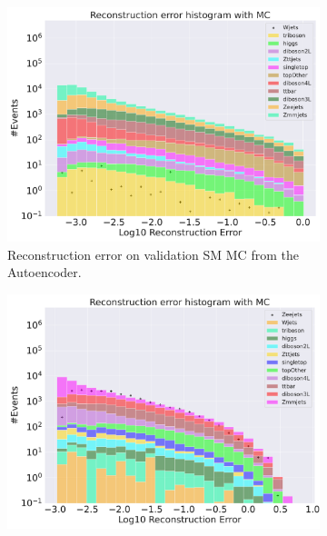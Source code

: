 \begin{figure}[h!]
    \centering
    \begin{subfigure}{.8\textwidth}
        \includegraphics[width=\textwidth]{Figures/AE_testing/big/b_data_recon_big_rm3_feats_sig_Wjets.pdf}
        \caption{Reconstruction error on validation SM MC from the Autoencoder. }
        \label{fig:ae_big_wjets}
    \end{subfigure}
    \hfill
    \begin{subfigure}{.8\textwidth}
        \includegraphics[width=\textwidth]{Figures/AE_testing/big/b_data_recon_big_rm3_feats_sig_Zeejets.pdf}
        \caption{}
        \label{fig:ae_big_zeejets}
    \end{subfigure}
    \hfill        
    \caption{ }
    \label{fig:ae_big_channel5}
\end{figure}

